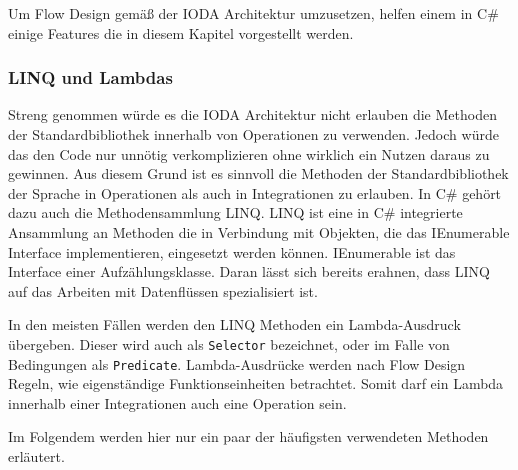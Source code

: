 Um Flow Design gemäß der IODA Architektur umzusetzen, helfen einem in C\# einige Features die in diesem Kapitel vorgestellt werden.

\subsubsection{LINQ und Lambdas}

Streng genommen würde es die IODA Architektur nicht erlauben die Methoden der
Standardbibliothek innerhalb von Operationen zu verwenden. Jedoch würde das den
Code nur unnötig verkomplizieren ohne wirklich ein Nutzen daraus zu gewinnen.
Aus diesem Grund ist es sinnvoll die Methoden der Standardbibliothek der Sprache
in Operationen als auch in Integrationen zu erlauben.
In C\# gehört dazu auch die Methodensammlung LINQ. 
LINQ ist eine in C\# integrierte Ansammlung an Methoden die in Verbindung mit
Objekten, die das IEnumerable Interface implementieren, eingesetzt werden
können.
IEnumerable ist das Interface einer Aufzählungsklasse. Daran lässt sich bereits erahnen, dass LINQ
auf das Arbeiten mit Datenflüssen spezialisiert ist.

In den meisten Fällen werden den LINQ Methoden ein Lambda-Ausdruck übergeben.
Dieser wird auch als \texttt{Selector} bezeichnet, oder im Falle von Bedingungen als \texttt{Predicate}.
Lambda-Ausdrücke werden nach Flow Design Regeln, wie eigenständige
Funktionseinheiten betrachtet. Somit darf ein Lambda innerhalb einer 
Integrationen auch eine Operation sein.




\bigskip
Im Folgendem werden hier nur ein paar der häufigsten verwendeten Methoden erläutert.

